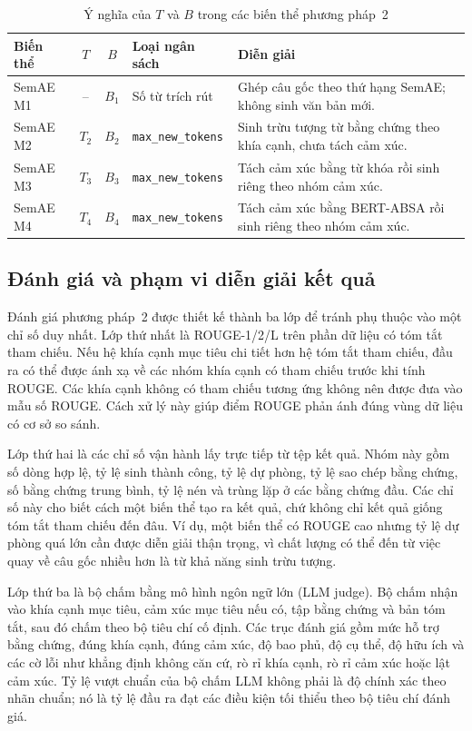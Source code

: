 \begin{table}[tbp]
\centering
\caption{Ý nghĩa của $T$ và $B$ trong các biến thể phương pháp~2}
\label{tab:method2-t-b-meaning}
\small
\begin{tabularx}{\textwidth}{l c c L{0.25\textwidth} Y}
\toprule
\textbf{Biến thể} & \textbf{$T$} & \textbf{$B$} & \textbf{Loại ngân sách} & \textbf{Diễn giải} \\
\midrule
SemAE M1 & -- & \(B_1\) & Số từ trích rút & Ghép câu gốc theo thứ hạng SemAE; không sinh văn bản mới. \\
SemAE M2 & \(T_2\) & \(B_2\) & \texttt{max\_new\_tokens} & Sinh trừu tượng từ bằng chứng theo khía cạnh, chưa tách cảm xúc. \\
SemAE M3 & \(T_3\) & \(B_3\) & \texttt{max\_new\_tokens} & Tách cảm xúc bằng từ khóa rồi sinh riêng theo nhóm cảm xúc. \\
SemAE M4 & \(T_4\) & \(B_4\) & \texttt{max\_new\_tokens} & Tách cảm xúc bằng BERT-ABSA rồi sinh riêng theo nhóm cảm xúc. \\
\bottomrule
\end{tabularx}
\end{table}

\subsection{Đánh giá và phạm vi diễn giải kết quả}
\label{subsec:method2-evaluation-scope}

Đánh giá phương pháp~2 được thiết kế thành ba lớp để tránh phụ thuộc vào một chỉ số duy nhất. Lớp thứ nhất là ROUGE-1/2/L trên phần dữ liệu có tóm tắt tham chiếu. Nếu hệ khía cạnh mục tiêu chi tiết hơn hệ tóm tắt tham chiếu, đầu ra có thể được ánh xạ về các nhóm khía cạnh có tham chiếu trước khi tính ROUGE. Các khía cạnh không có tham chiếu tương ứng không nên được đưa vào mẫu số ROUGE. Cách xử lý này giúp điểm ROUGE phản ánh đúng vùng dữ liệu có cơ sở so sánh.

Lớp thứ hai là các chỉ số vận hành lấy trực tiếp từ tệp kết quả. Nhóm này gồm số dòng hợp lệ, tỷ lệ sinh thành công, tỷ lệ dự phòng, tỷ lệ sao chép bằng chứng, số bằng chứng trung bình, tỷ lệ nén và trùng lặp ở các bằng chứng đầu. Các chỉ số này cho biết cách một biến thể tạo ra kết quả, chứ không chỉ kết quả giống tóm tắt tham chiếu đến đâu. Ví dụ, một biến thể có ROUGE cao nhưng tỷ lệ dự phòng quá lớn cần được diễn giải thận trọng, vì chất lượng có thể đến từ việc quay về câu gốc nhiều hơn là từ khả năng sinh trừu tượng.

Lớp thứ ba là bộ chấm bằng mô hình ngôn ngữ lớn (LLM judge). Bộ chấm nhận vào khía cạnh mục tiêu, cảm xúc mục tiêu nếu có, tập bằng chứng và bản tóm tắt, sau đó chấm theo bộ tiêu chí cố định. Các trục đánh giá gồm mức hỗ trợ bằng chứng, đúng khía cạnh, đúng cảm xúc, độ bao phủ, độ cụ thể, độ hữu ích và các cờ lỗi như khẳng định không căn cứ, rò rỉ khía cạnh, rò rỉ cảm xúc hoặc lật cảm xúc. Tỷ lệ vượt chuẩn của bộ chấm LLM không phải là độ chính xác theo nhãn chuẩn; nó là tỷ lệ đầu ra đạt các điều kiện tối thiểu theo bộ tiêu chí đánh giá.


